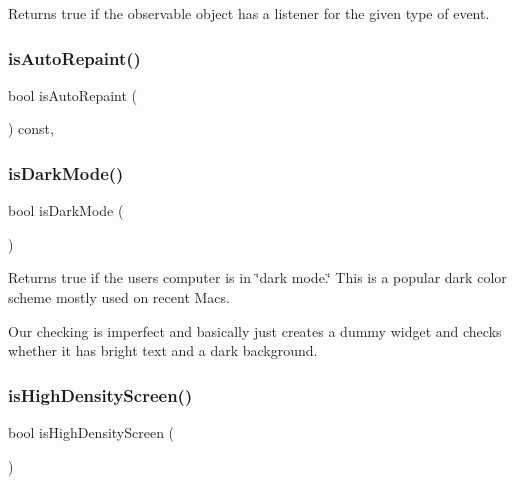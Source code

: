 Returns true if the observable object has a listener for the given type of event. 

\mbox{\label{classGForwardDrawingSurface_a189881032e2b355095790b83b2454d8d}} 
\subsubsection{\texorpdfstring{is\+Auto\+Repaint()}{isAutoRepaint()}}
{\footnotesize\ttfamily bool is\+Auto\+Repaint (\begin{DoxyParamCaption}{ }\end{DoxyParamCaption}) const\hspace{0.3cm}{\ttfamily [override]}, {\ttfamily [inherited]}}

\mbox{\label{classGWindow_a36044a6efa9c4e015378e56c3e37181d}} 
\subsubsection{\texorpdfstring{is\+Dark\+Mode()}{isDarkMode()}}
{\footnotesize\ttfamily bool is\+Dark\+Mode (\begin{DoxyParamCaption}{ }\end{DoxyParamCaption})\hspace{0.3cm}{\ttfamily [static]}}



Returns true if the user\textquotesingle{}s computer is in \char`\"{}dark mode.\char`\"{} This is a popular dark color scheme mostly used on recent Macs. 

Our checking is imperfect and basically just creates a dummy widget and checks whether it has bright text and a dark background. \mbox{\label{classGWindow_a674ef3ad6e66d778e410e130cad47274}} 
\subsubsection{\texorpdfstring{is\+High\+Density\+Screen()}{isHighDensityScreen()}}
{\footnotesize\ttfamily bool is\+High\+Density\+Screen (\begin{DoxyParamCaption}{ }\end{DoxyParamCaption})\hspace{0.3cm}{\ttfamily [static]}}




